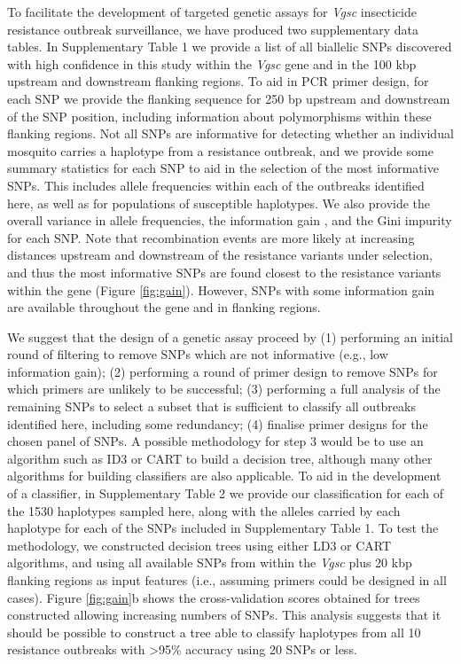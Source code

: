 \documentclass[a4paper,11pt,abstracton,hidelinks]{scrartcl}
\begin{document}
%
To facilitate the development of targeted genetic assays for \textit{Vgsc} insecticide resistance outbreak surveillance, we have produced two supplementary data tables.
%
In Supplementary Table 1 we provide a list of all biallelic SNPs discovered with high confidence in this study within the \textit{Vgsc} gene and in the 100 kbp upstream and downstream flanking regions.
%
To aid in PCR primer design, for each SNP we provide the flanking sequence for 250 bp upstream and downstream of the SNP position, including information about polymorphisms within these flanking regions.
%
Not all SNPs are informative for detecting whether an individual mosquito carries a haplotype from a resistance outbreak, and we provide some summary statistics for each SNP to aid in the selection of the most informative SNPs.
%
This includes allele frequencies within each of the outbreaks identified here, as well as for populations of susceptible haplotypes.
%
We also provide the overall variance in allele frequencies, the information gain \cite{Quinlan1986}, and the Gini impurity \cite{Breiman1984} for each SNP.
%
Note that recombination events are more likely at increasing distances upstream and downstream of the resistance variants under selection, and thus the most informative SNPs are found closest to the resistance variants within the gene (Figure \ref{fig:gain}).
%
However, SNPs with some information gain are available throughout the gene and in flanking regions.
%


%
We suggest that the design of a genetic assay proceed by (1) performing an initial round of filtering to remove SNPs which are not informative (e.g., low information gain); (2) performing a round of primer design to remove SNPs for which primers are unlikely to be successful; (3) performing a full analysis of the remaining SNPs to select a subset that is sufficient to classify all outbreaks identified here, including some redundancy; (4) finalise primer designs for the chosen panel of SNPs.
%
A possible methodology for step 3 would be to use an algorithm such as ID3 \cite{Quinlan1986} or CART \cite{Breiman1984} to build a decision tree, although many other algorithms for building classifiers are also applicable.
%
To aid in the development of a classifier, in Supplementary Table 2 we provide our classification for each of the 1530 haplotypes sampled here, along with the alleles carried by each haplotype for each of the SNPs included in Supplementary Table 1.
%
To test the methodology, we constructed decision trees using either LD3 or CART algorithms, and using all available SNPs from within the \textit{Vgsc} plus 20 kbp flanking regions as input features (i.e., assuming primers could be designed in all cases).
%
Figure \ref{fig:gain}b shows the cross-validation scores obtained for trees constructed allowing increasing numbers of SNPs.
%
This analysis suggests that it should be possible to construct a tree able to classify haplotypes from all 10 resistance outbreaks with >95\% accuracy using 20 SNPs or less.
\end{document}
